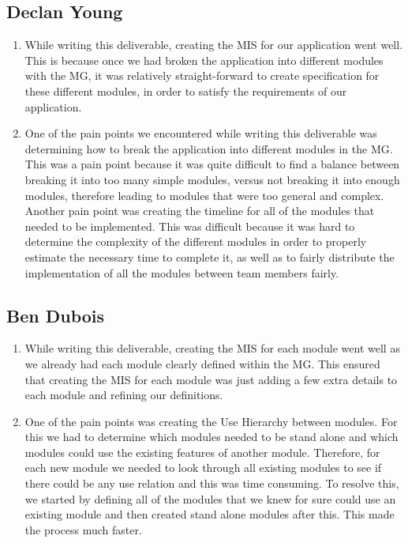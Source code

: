 \documentclass[12pt, titlepage]{article}
\begin{document}
\subsection*{Declan Young}

\begin{enumerate}
    \item While writing this deliverable, creating the MIS for our application went well. This is because once we had broken the application into different modules with the MG, it was relatively straight-forward to create specification for these different modules, in order to satisfy the requirements of our application. 
    \item One of the pain points we encountered while writing this deliverable was determining how to break the application into different modules in the MG. This was a pain point because it was quite difficult to find a balance between breaking it into too many simple modules, versus not breaking it into enough modules, therefore leading to modules that were too general and complex. Another pain point was creating the timeline for all of the modules that needed to be implemented. This was difficult because it was hard to determine the complexity of the different modules in order to properly estimate the necessary time to complete it, as well as to fairly distribute the implementation of all the modules between team members fairly.
\end{enumerate}

\subsection*{Ben Dubois}

\begin{enumerate}
    \item While writing this deliverable, creating the MIS for each module went well as we already had each module clearly defined within the MG. This ensured that creating the MIS for each module was just adding a few extra details to each module and refining our definitions. 
    
    \item One of the pain points was creating the Use Hierarchy between modules. For this we had to determine which modules needed to be stand alone and which modules could use the existing features of another module. Therefore, for each new module we needed to look through all existing modules to see if there could be any use relation and this was time consuming. To resolve this, we started by defining all of the modules that we knew for sure could use an existing module and then created stand alone modules after this. This made the process much faster. 
\end{enumerate}
\end{document}
